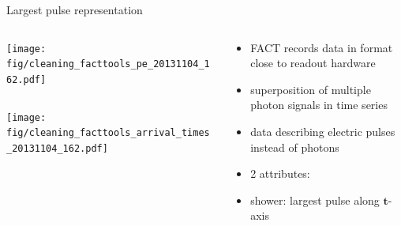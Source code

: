 \begin{frame}[c]{Largest pulse representation}
\begin{columns}[onlytextwidth]
    \begin{column}{0.475\textwidth}
      \begin{column}{0.475\textwidth}
        \texttt{[image: fig/cleaning\_facttools\_pe\_20131104\_162.pdf]}
      \end{column}
      \begin{column}{0.475\textwidth}
        \texttt{[image: fig/cleaning\_facttools\_arrival\_times\_20131104\_162.pdf]}
      \end{column}
    \end{column}
    \begin{column}{0.475\textwidth}
      \begin{itemize}
          \item FACT records data in format close to readout hardware
          \item superposition of multiple photon signals in time series
          \item data describing electric pulses instead of photons
          \item 2 attributes:
          \item shower: largest pulse along $\mathbf{t}$-axis
      \end{itemize}
    \end{column}
\end{columns}
\vspace{.5cm}

\end{frame}

